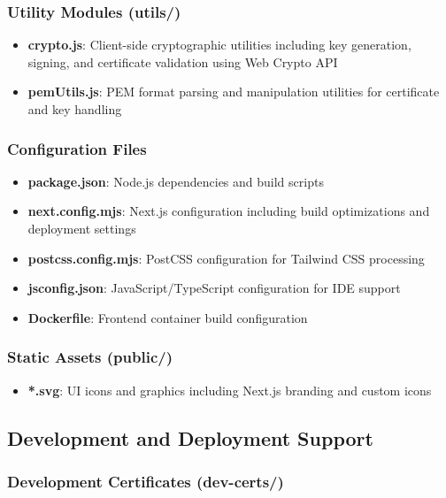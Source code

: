 \subsubsection{Utility Modules (utils/)}

\begin{itemize}
    \item \textbf{crypto.js}: Client-side cryptographic utilities including key generation, signing, and certificate validation using Web Crypto API
    \item \textbf{pemUtils.js}: PEM format parsing and manipulation utilities for certificate and key handling
\end{itemize}

\subsubsection{Configuration Files}

\begin{itemize}
    \item \textbf{package.json}: Node.js dependencies and build scripts
    \item \textbf{next.config.mjs}: Next.js configuration including build optimizations and deployment settings
    \item \textbf{postcss.config.mjs}: PostCSS configuration for Tailwind CSS processing
    \item \textbf{jsconfig.json}: JavaScript/TypeScript configuration for IDE support
    \item \textbf{Dockerfile}: Frontend container build configuration
\end{itemize}

\subsubsection{Static Assets (public/)}

\begin{itemize}
    \item \textbf{*.svg}: UI icons and graphics including Next.js branding and custom icons
\end{itemize}

\subsection{Development and Deployment Support}

\subsubsection{Development Certificates (dev-certs/)}


